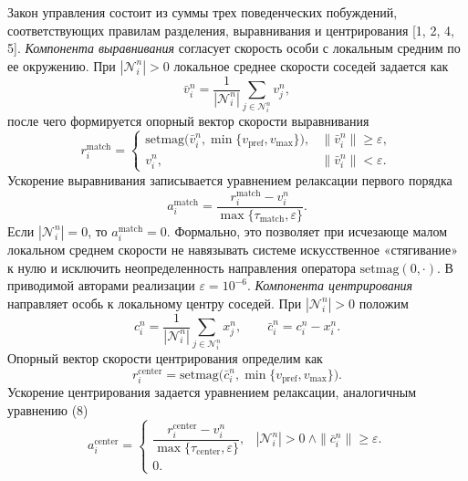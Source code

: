 \documentclass{article}
\begin{document}
Закон управления состоит из суммы трех поведенческих побуждений, соответствующих правилам разделения, выравнивания и центрирования [1, 2, 4, 5]. \textit{Компонента выравнивания} согласует скорость особи с локальным средним по ее окружению. При $|\mathcal N_i^n|>0$ локальное среднее скорости соседей задается как
\begin{equation}
    \bar v_i^n=\frac{1}{|\mathcal N_i^n|}\sum_{j\in\mathcal N_i^n} v_j^n,
\end{equation}
после чего формируется опорный вектор скорости выравнивания
\begin{equation}
    r_i^{\mathrm{match}}=
    \begin{cases}
    \mathrm{setmag}\!\bigl(\bar v_i^n,\min\{v_{\mathrm{pref}},v_{\max}\}\bigr), & \|\bar v_i^n\|\ge\varepsilon,\\
    v_i^n, & \|\bar v_i^n\|< \varepsilon.
\end{cases}
\end{equation}
Ускорение выравнивания записывается уравнением релаксации первого порядка
\begin{equation}
    a_i^{\mathrm{match}}=\dfrac{r_i^{\mathrm{match}}-v_i^n}{\max\{\tau_{\mathrm{match}}, \varepsilon\}}.
\end{equation}
Если $|\mathcal N_i^n|=0$, то $a_i^{\mathrm{match}}=0$. Формально, это позволяет при исчезающе малом локальном среднем скорости не навязывать системе искусственное «стягивание» к нулю и исключить неопределенность направления оператора $\mathrm{setmag}(0,\cdot)$. В приводимой авторами реализации $\varepsilon=10^{-6}$.  \textit{Компонента центрирования} направляет особь к локальному центру соседей. При $|\mathcal N_i^n|>0$ положим
\begin{equation}
    c_i^n=\frac{1}{|\mathcal N_i^n|}\sum_{j\in\mathcal N_i^n} x_j^n,\qquad \bar c_i^n=c_i^n-x_i^n.
\end{equation}
Опорный вектор скорости центрирования определим как
\begin{equation}
    r_i^{\mathrm{center}}=\mathrm{setmag}\!\bigl(\bar c_i^n,\min\{v_{\mathrm{pref}},v_{\max}\}\bigr).
\end{equation}
Ускорение центрирования задается уравнением релаксации, аналогичным уравнению (8)
\begin{equation}
    a_i^{\mathrm{center}}=
    \begin{cases}
    \dfrac{r_i^{\mathrm{center}}-v_i^n}{\max\{\tau_{\mathrm{center}},\varepsilon\}}, & |\mathcal N_i^n|>0\ \wedge \| \bar c_i^n\|\ge \varepsilon.\\
    0.
\end{cases}
\end{equation}
\end{document}
